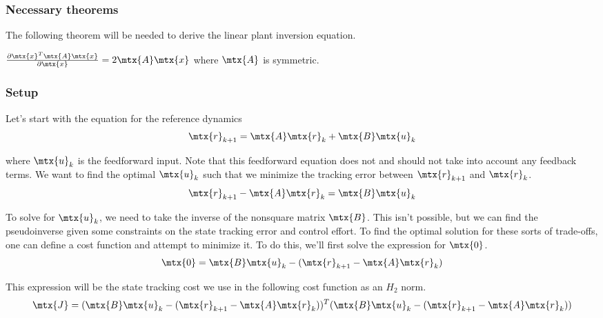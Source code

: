 \subsubsection{Necessary theorems}

The following theorem will be needed to derive the linear plant inversion
equation.
\begin{theorem}
  \label{thm:partial_xax}

  $\frac{\partial \mtx{x}^T\mtx{A}\mtx{x}}{\partial\mtx{x}} =
    2\mtx{A}\mtx{x}$ where $\mtx{A}$ is symmetric.
\end{theorem}

\subsubsection{Setup}

Let's start with the equation for the \gls{reference} dynamics
\begin{equation*}
  \mtx{r}_{k+1} = \mtx{A}\mtx{r}_k + \mtx{B}\mtx{u}_k
\end{equation*}

where $\mtx{u}_k$ is the feedforward input. Note that this feedforward equation
does not and should not take into account any feedback terms. We want to find
the optimal $\mtx{u}_k$ such that we minimize the \gls{tracking} error between
$\mtx{r}_{k+1}$ and $\mtx{r}_k$.
\begin{equation*}
  \mtx{r}_{k+1} - \mtx{A}\mtx{r}_k = \mtx{B}\mtx{u}_k
\end{equation*}

To solve for $\mtx{u}_k$, we need to take the inverse of the nonsquare matrix
$\mtx{B}$. This isn't possible, but we can find the pseudoinverse given some
constraints on the \gls{state} \gls{tracking} error and \gls{control effort}. To
find the optimal solution for these sorts of trade-offs, one can define a cost
function and attempt to minimize it. To do this, we'll first solve the
expression for $\mtx{0}$.
\begin{equation*}
  \mtx{0} = \mtx{B}\mtx{u}_k - (\mtx{r}_{k+1} - \mtx{A}\mtx{r}_k)
\end{equation*}

This expression will be the \gls{state} \gls{tracking} cost we use in the
following cost function as an $H_2$ norm.
\begin{equation*}
  \mtx{J} = (\mtx{B}\mtx{u}_k - (\mtx{r}_{k+1} - \mtx{A}\mtx{r}_k))^T
    (\mtx{B}\mtx{u}_k - (\mtx{r}_{k+1} - \mtx{A}\mtx{r}_k))
\end{equation*}

